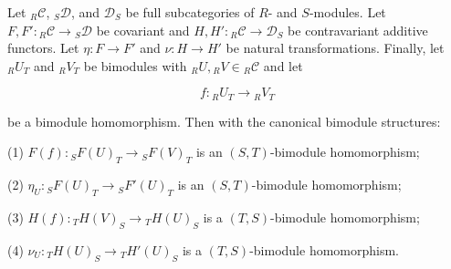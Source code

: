 Let ${}_R\mathcal{C}$, ${}_S\mathcal{D}$, and $\mathcal{D}_S$ be full subcategories of $R$- and $S$-modules. Let $F, F': {}_R\mathcal{C} \to {}_S\mathcal{D}$ be covariant and $H, H': {}_R\mathcal{C} \to \mathcal{D}_S$ be contravariant additive functors. Let $\eta: F \to F'$ and $\nu: H \to H'$ be natural transformations. Finally, let ${}_R U_T$ and ${}_R V_T$ be bimodules with ${}_R U, {}_R V \in {}_R\mathcal{C}$ and let

$$f: {}_R U_T \to {}_R V_T$$

be a bimodule homomorphism. Then with the canonical bimodule structures:

(1) $F(f): {}_S F(U)_T \to {}_S F(V)_T$ is an $(S,T)$-bimodule homomorphism;

(2) $\eta_U: {}_S F(U)_T \to {}_S F'(U)_T$ is an $(S,T)$-bimodule homomorphism;

(3) $H(f): {}_T H(V)_S \to {}_T H(U)_S$ is a $(T,S)$-bimodule homomorphism;

(4) $\nu_U: {}_T H(U)_S \to {}_T H'(U)_S$ is a $(T,S)$-bimodule homomorphism.
